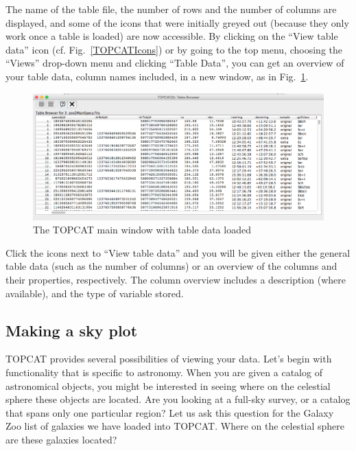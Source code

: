 \documentclass[twocolumn,apj]{openjournal}
\begin{document}
The name of the table file, the number of rows and the number of columns are displayed, and some of the icons that were initially greyed out (because they only work once a table is loaded) are now accessible.  By clicking on the ``View table data'' icon (cf. Fig.~\ref{TOPCATIcons}) or by going to the top menu, choosing the ``Views'' drop-down menu and clicking ``Table Data'', you can get an overview of your table data, column names included, in a new window, as in Fig.~\ref{TOPCATTableData}.
\begin{figure}[htbp]
\begin{center}
\includegraphics[width=\linewidth]{topcat-data.png}
\caption{The TOPCAT main window with table data loaded}
\label{TOPCATTableData}
\end{center}
\end{figure}

Click the icons next to ``View table data'' and you will be given either the general table data (such as the number of columns) or an overview of the columns and their properties, respectively. The column overview includes a description (where available), and the type of variable stored. 

\subsection{Making a sky plot}

TOPCAT provides several possibilities of viewing your data. Let's begin with functionality that is specific to astronomy. When you are given a catalog of astronomical objects, you might be interested in seeing where on the celestial sphere these objects are located. Are you looking at a full-sky survey, or a catalog that spans only one particular region? Let us ask this question for the Galaxy Zoo list of galaxies we have loaded into TOPCAT. Where on the celestial sphere are these galaxies located?
\end{document}
